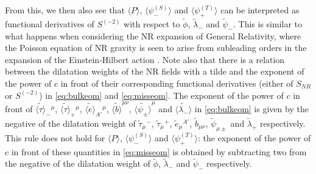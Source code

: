\documentclass[a4paper,10pt,openany]{article}
\begin{document}
	From this, we then also see that $\langle P \rangle$, $\langle\psi_-^{(S)}\rangle$ and $\langle \psi_+^{(T)}\rangle$ can be interpreted as functional derivatives of $S^{(-2)}$ with respect to $\tilde{\phi}$, $\tilde{\lambda}_-$ and $\tilde{\psi}_-$. This is similar to what happens when considering the NR expansion of General Relativity, where the Poisson equation of NR gravity is seen to arise from subleading orders in the expansion of the Einstein-Hilbert action \cite{Hansen:2019pkl,Hansen:2020pqs}. Note also that there is a relation between the dilatation weights of the NR fields with a tilde and the exponent of the power of $c$ in front of their corresponding functional derivatives (either of $S_{NR}$ or $S^{(-2)}$) in \eqref{eq:bulkeom} and \eqref{eq:misseom}. The exponent of the power of $c$ in front of $\widetilde{\langle \tau\rangle}_-{}^\mu$, $\widetilde{\langle \tau\rangle}_+{}^\mu$, $\widetilde{\langle e\rangle}_{A'}{}^\mu$, $\widetilde{\langle b\rangle}^{\mu\nu}$, $\widetilde{\langle\psi_\pm\rangle}^\mu$ and $\widetilde{\langle\lambda_-\rangle}$ in \eqref{eq:bulkeom} is given by the negative of the dilatation weight of $\tilde{\tau}_\mu{}^-$, $\tilde{\tau}_\mu{}^+$, $\tilde{e}_\mu{}^{A'}$, $\tilde{b}_{\mu\nu}$, $\tilde{\psi}_{\mu \pm}$ and $\tilde{\lambda}_+$ respectively. This rule does not hold for $\langle P \rangle$, $\langle\psi_-^{(S)}\rangle$ and $\langle \psi_+^{(T)}\rangle$: the exponent of the power of $c$ in front of these quantities in \eqref{eq:misseom} is obtained by subtracting two from the negative of the dilatation weight of $\tilde{\phi}$, $\tilde{\lambda}_-$ and $\tilde{\psi}_-$ respectively.
	
\end{document}
